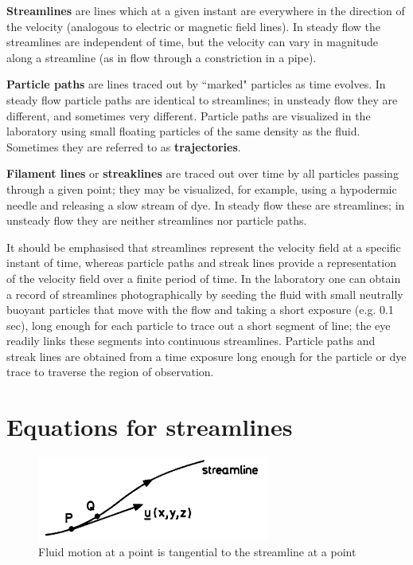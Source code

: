 \documentclass[10pt]{report}
\begin{document}
\textbf{Streamlines} are lines which at a given instant are everywhere in the direction of
the velocity (analogous to electric or magnetic field lines). In steady flow the streamlines
are independent of time, but the velocity can vary in magnitude along a streamline (as in
flow through a constriction in a pipe).

\textbf{Particle paths} are lines traced out by ``marked" particles as time evolves. In
steady flow particle paths are identical to streamlines; in unsteady flow they are
different, and sometimes very different. Particle paths are visualized in the laboratory
using small floating particles of the same density as the fluid. Sometimes they are referred
to as \textbf{trajectories}.

\textbf{Filament lines} or \textbf{streaklines} are traced out over time by all particles
passing through a given point; they may be visualized, for example, using a hypodermic
needle and releasing a slow stream of dye. In steady flow these are streamlines; in unsteady
flow they are neither streamlines nor particle paths.

It should be emphasised that streamlines represent the velocity field at a specific instant
of time, whereas particle paths and streak lines provide a representation of the velocity
field over a finite period of time. In the laboratory one can obtain a record of streamlines
photographically by seeding the fluid with small neutrally buoyant particles that move with
the flow and taking a short exposure (e.g. 0.1 sec), long enough for each particle to trace
out a short segment of line; the eye readily links these segments into continuous
streamlines. Particle paths and streak lines are obtained from a time exposure long enough
for the particle or dye trace to traverse the region of observation.

\section{Equations for streamlines}
\begin{figure}
\centerline{\includegraphics[width=3in]{Section4.pdf}}
\label{fig1.4}
\caption{ Fluid motion at a point is tangential to the streamline at a point }
\end{figure}
\end{document}
